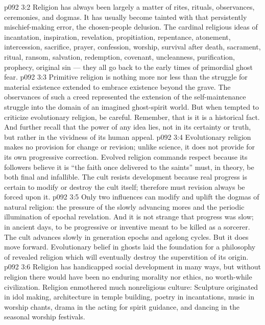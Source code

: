 \vs p092 3:2 Religion has always been largely a matter of rites, rituals, observances, ceremonies, and dogmas. It has usually become tainted with that persistently mischief\hyp{}making error, the chosen\hyp{}people delusion. The cardinal religious ideas of incantation, inspiration, revelation, propitiation, repentance, atonement, intercession, sacrifice, prayer, confession, worship, survival after death, sacrament, ritual, ransom, salvation, redemption, covenant, uncleanness, purification, prophecy, original sin --- they all go back to the early times of primordial ghost fear.
\vs p092 3:3 \pc Primitive religion is nothing more nor less than the struggle for material existence extended to embrace existence beyond the grave. The observances of such a creed represented the extension of the self\hyp{}maintenance struggle into the domain of an imagined ghost\hyp{}spirit world. But when tempted to criticize evolutionary religion, be careful. Remember, that is  it is a historical fact. And further recall that the power of any idea lies, not in its certainty or truth, but rather in the vividness of its human appeal.
\vs p092 3:4 \pc Evolutionary religion makes no provision for change or revision; unlike science, it does not provide for its own progressive correction. Evolved religion commands respect because its followers believe it is  “the faith once delivered to the saints” must, in theory, be both final and infallible. The cult resists development because real progress is certain to modify or destroy the cult itself; therefore must revision always be forced upon it.
\vs p092 3:5 Only two influences can modify and uplift the dogmas of natural religion: the pressure of the slowly advancing mores and the periodic illumination of epochal revelation. And it is not strange that progress was slow; in ancient days, to be progressive or inventive meant to be killed as a sorcerer. The cult advances slowly in generation epochs and agelong cycles. But it does move forward. Evolutionary belief in ghosts laid the foundation for a philosophy of revealed religion which will eventually destroy the superstition of its origin.
\vs p092 3:6 Religion has handicapped social development in many ways, but without religion there would have been no enduring morality nor ethics, no worth\hyp{}while civilization. Religion enmothered much nonreligious culture: Sculpture originated in idol making, architecture in temple building, poetry in incantations, music in worship chants, drama in the acting for spirit guidance, and dancing in the seasonal worship festivals.
